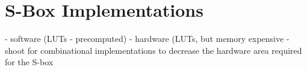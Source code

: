 \section{S-Box Implementations}
- software (LUTs - precomputed)
- hardware (LUTs, but memory expensive - shoot for combinational implementations to decrease the hardware area required for the S-box
